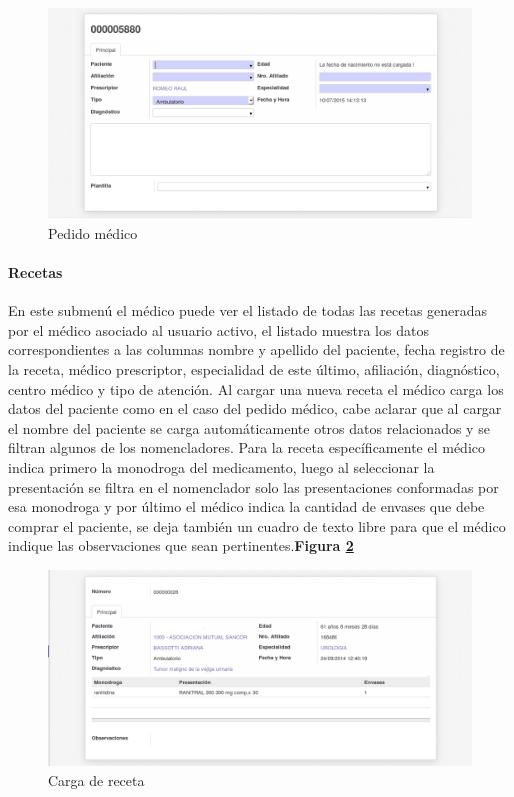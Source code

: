 \begin{figure}[h]
      \centering
      \includegraphics[width=.8\textwidth]{img/tp1/HE/PedidoMedico}
      \caption{Pedido médico}
      \label{pedido-medico}
\end{figure}


\paragraph{Recetas}

En este submenú el médico puede ver el listado de todas las recetas generadas por el médico asociado al usuario activo, el listado muestra los datos correspondientes a las columnas nombre y apellido del paciente, fecha registro de la receta, médico prescriptor, especialidad de este último, afiliación, diagnóstico, centro médico y tipo de atención. Al cargar una nueva receta el médico carga los datos del paciente como en el caso del pedido médico, cabe aclarar que al cargar el nombre del paciente se carga automáticamente otros datos relacionados y se filtran algunos de los nomencladores. Para la receta específicamente el médico indica primero la monodroga del medicamento, luego al seleccionar la presentación se filtra en el nomenclador solo las presentaciones conformadas por esa monodroga y por último el médico indica la cantidad de envases que debe comprar el paciente, se deja también un cuadro de texto libre para que el médico indique las observaciones que sean pertinentes.\textbf{Figura \ref{receta}}

\begin{figure}
      \centering
      \includegraphics[width=.8\textwidth]{img/tp1/HE/Receta}
      \caption{Carga de receta}
      \label{receta}
\end{figure}


